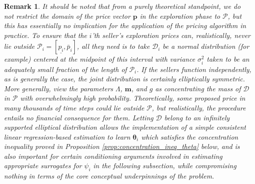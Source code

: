 \documentclass{article} %
\newtheorem{remark}[theorem]{Remark}
\begin{document}
\begin{remark}\label{remark:domain_P_psi_estimation}
It should be noted that from a purely theoretical standpoint, we do not restrict the domain of the price vector $\mathbf{p}$ in the exploration phase to $\mathcal{P}$, but \emph{this has essentially no implication for the application of the pricing algorithm in practice}. To ensure that the $i$'th seller's exploration prices can, realistically, never lie outside $\mathcal{P}_i = [\underline{p_i}, \bar{p}_i]$, all they need is to take  $\mathscr{D}_i$ be a normal distribution (for example) centered at the midpoint of this interval with variance $\sigma_i^2$ taken to be an adequately small fraction of the length of $\mathcal P_i$. If the sellers function independently, as is generally the case, the joint distribution is certainly elliptically symmetric. More generally, view the parameters $\Lambda$, $\mathbf{m}$, and $g$ as concentrating the mass of $\mathscr{D}$ in $\mathcal{P}$ with overwhelmingly high probability.  Theoretically, some proposed price in many thousands of time steps could lie outside $\mathcal{P}$, but realistically, the procedure entails no financial consequence for them. Letting $\mathscr{D}$ belong to an infinitely supported elliptical distribution allows the implementation of a simple consistent linear regression-based estimation to learn $\boldsymbol{\theta}_i$ which satisfies the concentration inequality proved in Proposition \ref{prop:concentration_ineq_theta} below, and is also important for certain conditioning arguments involved in estimating appropriate surrogates for $\psi_i$ in the following subsection, while compromising nothing in terms of the core conceptual underpinnings of the problem. 
\end{remark}
\end{document}
